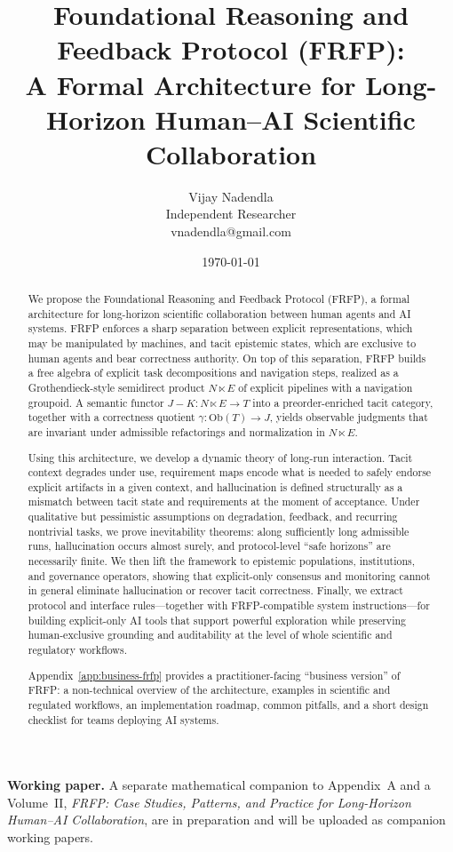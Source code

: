 \documentclass[11pt]{article}
\title{Foundational Reasoning and Feedback Protocol (FRFP):\\
A Formal Architecture for Long-Horizon Human--AI Scientific Collaboration}
\author{Vijay Nadendla\\[0.3ex]
Independent Researcher\\
vnadendla@gmail.com}
\date{\today}
\theoremstyle{definition}
\begin{document}
\maketitle
\begin{center}
\textbf{Working paper.} A separate mathematical companion to Appendix~A and a Volume~II, \emph{FRFP: Case Studies, Patterns, and Practice for Long-Horizon Human--AI Collaboration}, are in preparation and will be uploaded as companion working papers.
\end{center}


\begin{abstract}
We propose the Foundational Reasoning and Feedback Protocol (FRFP), a formal architecture for long-horizon scientific collaboration between human agents and AI systems. FRFP enforces a sharp separation between explicit representations, which may be manipulated by machines, and tacit epistemic states, which are exclusive to human agents and bear correctness authority. On top of this separation, FRFP builds a free algebra of explicit task decompositions and navigation steps, realized as a Grothendieck-style semidirect product \(N \ltimes E\) of explicit pipelines with a navigation groupoid. A semantic functor \(J{-}K : N \ltimes E \to T\) into a preorder-enriched tacit category, together with a correctness quotient \(\gamma : \mathrm{Ob}(T) \to J\), yields observable judgments that are invariant under admissible refactorings and normalization in \(N \ltimes E\).

Using this architecture, we develop a dynamic theory of long-run interaction. Tacit context degrades under use, requirement maps encode what is needed to safely endorse explicit artifacts in a given context, and hallucination is defined structurally as a mismatch between tacit state and requirements at the moment of acceptance. Under qualitative but pessimistic assumptions on degradation, feedback, and recurring nontrivial tasks, we prove inevitability theorems: along sufficiently long admissible runs, hallucination occurs almost surely, and protocol-level ``safe horizons'' are necessarily finite. We then lift the framework to epistemic populations, institutions, and governance operators, showing that explicit-only consensus and monitoring cannot in general eliminate hallucination or recover tacit correctness. Finally, we extract protocol and interface rules---together with FRFP-compatible system instructions---for building explicit-only AI tools that support powerful exploration while preserving human-exclusive grounding and auditability at the level of whole scientific and regulatory workflows.

Appendix~\ref{app:business-frfp}  provides a practitioner-facing ``business version'' of FRFP: a non-technical overview of the architecture, examples in scientific and regulated workflows, an implementation roadmap, common pitfalls, and a short design checklist for teams deploying AI systems.

\end{abstract}
\end{document}
